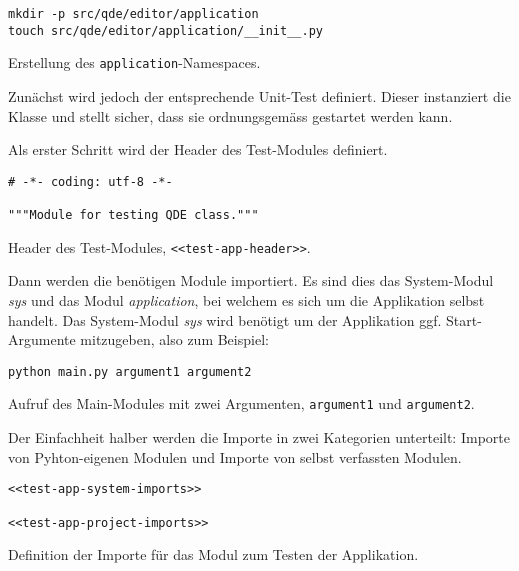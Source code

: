 \documentclass[10pt, openright, notitlepage]{scrreprt}
\begin{document}
\begin{listing}[H]
\begin{verbatim}
mkdir -p src/qde/editor/application
touch src/qde/editor/application/__init__.py
\end{verbatim}
\caption{\label{orgab9f768}
Erstellung des \texttt{application}-Namespaces.}
\end{listing}

Zunächst wird jedoch der entsprechende Unit-Test definiert. Dieser instanziert
die Klasse und stellt sicher, dass sie ordnungsgemäss gestartet werden kann.

Als erster Schritt wird der Header des Test-Modules definiert.

\begin{listing}[H]
\begin{verbatim}
# -*- coding: utf-8 -*-

"""Module for testing QDE class."""
\end{verbatim}
\caption{\label{org0a773af}
Header des Test-Modules, \texttt{<<test-app-header>>}.}
\end{listing}

Dann werden die benötigen Module importiert. Es sind dies das System-Modul
\emph{sys} und das Modul \emph{application}, bei welchem es sich um die Applikation
selbst handelt. Das System-Modul \emph{sys} wird benötigt um der Applikation ggf.
Start-Argumente mitzugeben, also zum Beispiel:

\begin{listing}[H]
\begin{verbatim}
python main.py argument1 argument2
\end{verbatim}
\caption{\label{orge386b83}
Aufruf des Main-Modules mit zwei Argumenten, \texttt{argument1} und \texttt{argument2}.}
\end{listing}

Der Einfachheit halber werden die Importe in zwei Kategorien unterteilt: Importe
von Pyhton-eigenen Modulen und Importe von selbst verfassten Modulen.

\begin{listing}[H]
\begin{verbatim}
<<test-app-system-imports>>

<<test-app-project-imports>>
\end{verbatim}
\caption{\label{orgd0c4720}
Definition der Importe für das Modul zum Testen der Applikation.}
\end{listing}
\end{document}
